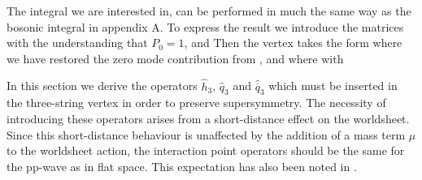 The integral we are interested in,
\eqn{}
can be performed in much the same way as the bosonic
integral in appendix A.
To express the result we introduce the matrices
\eqn{}
with the understanding that $P_0 = 1$,
and
\eqn{}
Then the vertex takes the form
\eqn{}
where we have restored the zero mode contribution from \ebdef, and
where
\eqn{}
with
\eqn{}




In this section we derive the operators $\hat{h}_3$,
$\hat{q}_3$ and $\hat{\overline{q}}_3$ which must be inserted in the
three-string vertex in order to preserve supersymmetry.
The necessity of introducing these operators arises
from a short-distance effect on the worldsheet.  Since this
short-distance behaviour is unaffected by the addition
of a mass term $\mu$ to the worldsheet action,
the interaction point operators should be the same for the pp-wave
as in flat space.  This expectation has also been noted in
\BerkovitsZV.


